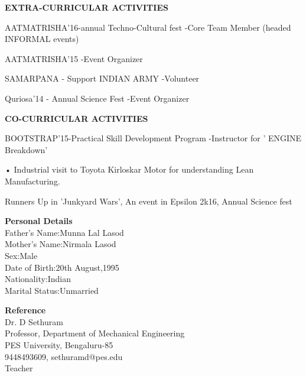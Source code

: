 \documentclass{article}
\begin{document}
\begin{center}

\textbf{\LARGE EXTRA-CURRICULAR ACTIVITIES}
\begin{itemize}
	{\large \item AATMATRISHA'16-annual Techno-Cultural fest
		-Core Team Member (headed INFORMAL events) }
	{\large \item AATMATRISHA'15
		-Event Organizer}
	{\large \item SAMARPANA - Support INDIAN ARMY
		-Volunteer }
	{\large \item Quriosa'14 - Annual Science Fest
		-Event Organizer }
\end{itemize}\vspace{15px}


\textbf{\LARGE CO-CURRICULAR ACTIVITIES}
\begin{enumerate}
	{\large \item BOOTSTRAP'15-Practical Skill Development
		Program
		-Instructor for ' ENGINE Breakdown' }
	
	{\large \item •	Industrial visit to Toyota Kirloskar Motor for understanding Lean Manufacturing. }
	{\large \item Runners Up in 'Junkyard Wars',
		An event in Epsilon 2k16, Annual Science fest }
\end{enumerate}\vspace{15px}

\end{center}


\textbf{\LARGE Personal Details}\\
{\normalsize Father's Name:Munna Lal Lasod\\
	Mother's Name:Nirmala Lasod\\
	Sex:Male\\
	Date of Birth:20th August,1995\\
	Nationality:Indian\\
	Marital Status:Unmarried\\}


\textbf{\LARGE Reference}\\
{\normalsize Dr. D  Sethuram\\
	Professor, Department of Mechanical Engineering\\
	PES University, Bengaluru-85\\
	9448493609, sethuramd@pes.edu\\
	Teacher\\}
\end{document}
